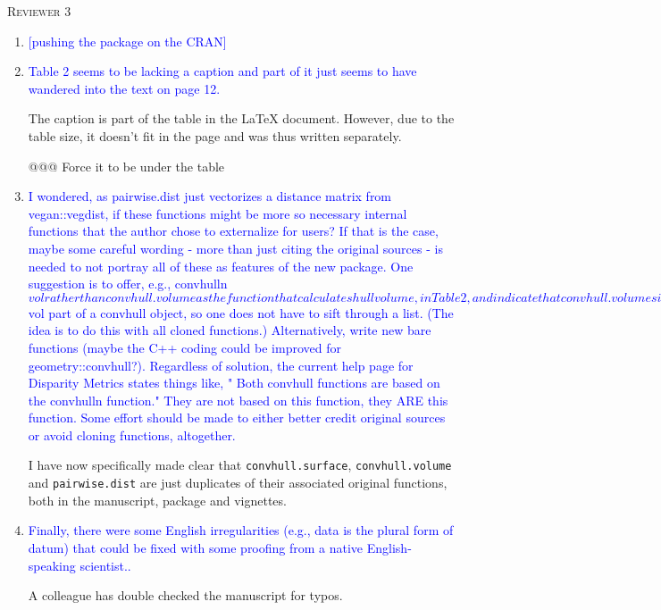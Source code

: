\documentclass[12pt,letterpaper]{article}
\renewcommand{\section}[1]{%
\bigskip
\begin{center}
\begin{Large}
\normalfont\scshape #1
\medskip
\end{Large}
\end{center}}
\begin{document}
\section{Reviewer 3}

\begin{enumerate}

\item{\textcolor{blue}{[pushing the package on the CRAN]}}

\item{\textcolor{blue}{Table 2 seems to be lacking a caption and part of it just seems to have wandered into the text on page 12. }}

The caption is part of the table in the LaTeX document.
However, due to the table size, it doesn't fit in the page and was thus written separately.

@@@ Force it to be under the table


\item{\textcolor{blue}{I wondered, as pairwise.dist just vectorizes a distance matrix from vegan::vegdist, if these functions might be more so necessary internal functions that the author chose to externalize for users? 
If that is the case, maybe some careful wording - more than just citing the original sources - is needed to not portray all of these as features of the new package.
One suggestion is to offer, e.g., convhulln$vol rather than convhull.volume as the function that calculates hull volume, in Table 2, and indicate that convhull.volume similarly returns the $vol part of a convhull object, so one does not have to sift through a list. 
(The idea is to do this with all cloned functions.) 
Alternatively, write new bare functions (maybe the C++ coding could be improved for geometry::convhull?).
Regardless of solution, the current help page for Disparity Metrics states things like, " Both convhull functions are based on the convhulln function."  They are not based on this function, they ARE this function.  Some effort should be made to either better credit original sources or avoid cloning functions, altogether.}}

I have now specifically made clear that \texttt{convhull.surface}, \texttt{convhull.volume} and \texttt{pairwise.dist} are just duplicates of their associated original functions, both in the manuscript, package and vignettes.

\item{\textcolor{blue}{Finally, there were some English irregularities (e.g., data is the plural form of datum) that could be fixed with some proofing from a native English-speaking scientist..}}

A colleague has double checked the manuscript for typos.

\end{enumerate}
\end{document}
